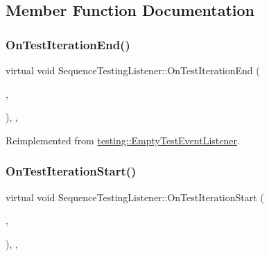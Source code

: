 \subsection{Member Function Documentation}
\mbox{\label{class_sequence_testing_listener_a783bc01e2a95f5bf73bbde4d96832e0f}} 
\subsubsection{\texorpdfstring{On\+Test\+Iteration\+End()}{OnTestIterationEnd()}}
{\footnotesize\ttfamily virtual void Sequence\+Testing\+Listener\+::\+On\+Test\+Iteration\+End (\begin{DoxyParamCaption}\item[{const \hyperlink{classtesting_1_1_unit_test}{Unit\+Test} \&}]{,  }\item[{int}]{ }\end{DoxyParamCaption})\hspace{0.3cm}{\ttfamily [inline]}, {\ttfamily [protected]}, {\ttfamily [virtual]}}



Reimplemented from \hyperlink{classtesting_1_1_empty_test_event_listener_a2253e5a18b3cf7bccd349567a252209d}{testing\+::\+Empty\+Test\+Event\+Listener}.

\mbox{\label{class_sequence_testing_listener_a345641262fa10cc4b251ac54116db74b}} 
\subsubsection{\texorpdfstring{On\+Test\+Iteration\+Start()}{OnTestIterationStart()}}
{\footnotesize\ttfamily virtual void Sequence\+Testing\+Listener\+::\+On\+Test\+Iteration\+Start (\begin{DoxyParamCaption}\item[{const \hyperlink{classtesting_1_1_unit_test}{Unit\+Test} \&}]{,  }\item[{int}]{ }\end{DoxyParamCaption})\hspace{0.3cm}{\ttfamily [inline]}, {\ttfamily [protected]}, {\ttfamily [virtual]}}



